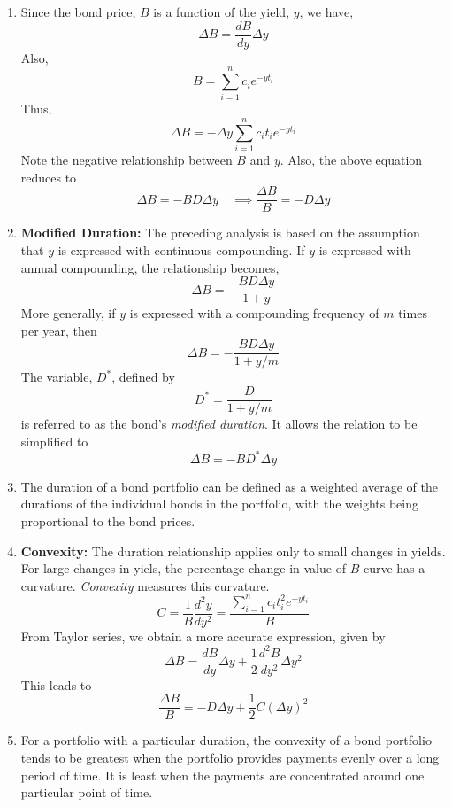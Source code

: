 \begin{enumerate}
    \item Since the bond price, $B$ is a function of the yield, $y$, we have, $$\Delta B = \frac{dB}{dy} \Delta y$$
    Also, $$ B = \sum_{i = 1}^{n} c_i e^{-yt_i}$$
    Thus, $$\Delta B = - \Delta y \sum_{i = 1}^{n} c_i t_i e^{-yt_i}$$
    Note the negative relationship between $B$ and $y$. Also, the above equation reduces to $$\Delta B = - B D \Delta y \quad \implies \frac{\Delta B}{B} = - D \Delta y$$
    \item \textbf{Modified Duration:} The preceding analysis is based on the assumption that $y$ is expressed with continuous compounding. If $y$ is expressed with annual compounding, the relationship becomes, $$\Delta B = - \frac{BD \Delta y}{1 + y}$$
    More generally, if $y$ is expressed with a compounding frequency of $m$ times per year, then $$\Delta B = - \frac{BD \Delta y}{1 + y/m}$$
    The variable, $D^*$, defined by $$D^* = \frac{D}{1 + y/m}$$ is referred to as the bond's \textit{modified duration}. It allows the relation to be simplified to $$\Delta B = - B D^* \Delta y$$
    \item The duration of a bond portfolio can be defined as a weighted average of the durations of the individual bonds in the portfolio, with the weights being proportional to the bond prices.
    \item \textbf{Convexity:} The duration relationship applies only to small changes in yields. For large changes in yiels, the percentage change in value of $B$ curve has a curvature. \textit{Convexity} measures this curvature. $$C = \frac{1}{B} \frac{d^2 y}{dy^2} = \frac{\sum_{i = 1}^{n} c_i t_i^2 e^{-yt_i}}{B}$$
    From Taylor series, we obtain a more accurate expression, given by $$\Delta B = \frac{dB}{dy} \Delta y + \frac{1}{2} \frac{d^2B}{dy^2} \Delta y^2$$ This leads to 
    $$\frac{\Delta B}{B} = -D \Delta y + \frac{1}{2} C (\Delta y)^2$$
    \item For a portfolio with a particular duration, the convexity of a bond portfolio tends to be greatest when the portfolio provides payments evenly over a long period of time. It is least when the payments are concentrated around one particular point of time.


\end{enumerate}